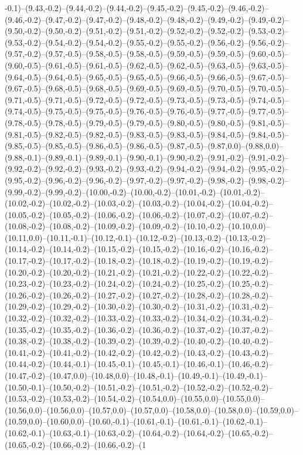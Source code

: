 -0.1)--(9.43,-0.2)--(9.44,-0.2)--(9.44,-0.2)--(9.45,-0.2)--(9.45,-0.2)--(9.46,-0.2)--(9.46,-0.2)--(9.47,-0.2)--(9.47,-0.2)--(9.48,-0.2)--(9.48,-0.2)--(9.49,-0.2)--(9.49,-0.2)--(9.50,-0.2)--(9.50,-0.2)--(9.51,-0.2)--(9.51,-0.2)--(9.52,-0.2)--(9.52,-0.2)--(9.53,-0.2)--(9.53,-0.2)--(9.54,-0.2)--(9.54,-0.2)--(9.55,-0.2)--(9.55,-0.2)--(9.56,-0.2)--(9.56,-0.2)--(9.57,-0.2)--(9.57,-0.5)--(9.58,-0.5)--(9.58,-0.5)--(9.59,-0.5)--(9.59,-0.5)--(9.60,-0.5)--(9.60,-0.5)--(9.61,-0.5)--(9.61,-0.5)--(9.62,-0.5)--(9.62,-0.5)--(9.63,-0.5)--(9.63,-0.5)--(9.64,-0.5)--(9.64,-0.5)--(9.65,-0.5)--(9.65,-0.5)--(9.66,-0.5)--(9.66,-0.5)--(9.67,-0.5)--(9.67,-0.5)--(9.68,-0.5)--(9.68,-0.5)--(9.69,-0.5)--(9.69,-0.5)--(9.70,-0.5)--(9.70,-0.5)--(9.71,-0.5)--(9.71,-0.5)--(9.72,-0.5)--(9.72,-0.5)--(9.73,-0.5)--(9.73,-0.5)--(9.74,-0.5)--(9.74,-0.5)--(9.75,-0.5)--(9.75,-0.5)--(9.76,-0.5)--(9.76,-0.5)--(9.77,-0.5)--(9.77,-0.5)--(9.78,-0.5)--(9.78,-0.5)--(9.79,-0.5)--(9.79,-0.5)--(9.80,-0.5)--(9.80,-0.5)--(9.81,-0.5)--(9.81,-0.5)--(9.82,-0.5)--(9.82,-0.5)--(9.83,-0.5)--(9.83,-0.5)--(9.84,-0.5)--(9.84,-0.5)--(9.85,-0.5)--(9.85,-0.5)--(9.86,-0.5)--(9.86,-0.5)--(9.87,-0.5)--(9.87,0.0)--(9.88,0.0)--(9.88,-0.1)--(9.89,-0.1)--(9.89,-0.1)--(9.90,-0.1)--(9.90,-0.2)--(9.91,-0.2)--(9.91,-0.2)--(9.92,-0.2)--(9.92,-0.2)--(9.93,-0.2)--(9.93,-0.2)--(9.94,-0.2)--(9.94,-0.2)--(9.95,-0.2)--(9.95,-0.2)--(9.96,-0.2)--(9.96,-0.2)--(9.97,-0.2)--(9.97,-0.2)--(9.98,-0.2)--(9.98,-0.2)--(9.99,-0.2)--(9.99,-0.2)--(10.00,-0.2)--(10.00,-0.2)--(10.01,-0.2)--(10.01,-0.2)--(10.02,-0.2)--(10.02,-0.2)--(10.03,-0.2)--(10.03,-0.2)--(10.04,-0.2)--(10.04,-0.2)--(10.05,-0.2)--(10.05,-0.2)--(10.06,-0.2)--(10.06,-0.2)--(10.07,-0.2)--(10.07,-0.2)--(10.08,-0.2)--(10.08,-0.2)--(10.09,-0.2)--(10.09,-0.2)--(10.10,-0.2)--(10.10,0.0)--(10.11,0.0)--(10.11,-0.1)--(10.12,-0.1)--(10.12,-0.2)--(10.13,-0.2)--(10.13,-0.2)--(10.14,-0.2)--(10.14,-0.2)--(10.15,-0.2)--(10.15,-0.2)--(10.16,-0.2)--(10.16,-0.2)--(10.17,-0.2)--(10.17,-0.2)--(10.18,-0.2)--(10.18,-0.2)--(10.19,-0.2)--(10.19,-0.2)--(10.20,-0.2)--(10.20,-0.2)--(10.21,-0.2)--(10.21,-0.2)--(10.22,-0.2)--(10.22,-0.2)--(10.23,-0.2)--(10.23,-0.2)--(10.24,-0.2)--(10.24,-0.2)--(10.25,-0.2)--(10.25,-0.2)--(10.26,-0.2)--(10.26,-0.2)--(10.27,-0.2)--(10.27,-0.2)--(10.28,-0.2)--(10.28,-0.2)--(10.29,-0.2)--(10.29,-0.2)--(10.30,-0.2)--(10.30,-0.2)--(10.31,-0.2)--(10.31,-0.2)--(10.32,-0.2)--(10.32,-0.2)--(10.33,-0.2)--(10.33,-0.2)--(10.34,-0.2)--(10.34,-0.2)--(10.35,-0.2)--(10.35,-0.2)--(10.36,-0.2)--(10.36,-0.2)--(10.37,-0.2)--(10.37,-0.2)--(10.38,-0.2)--(10.38,-0.2)--(10.39,-0.2)--(10.39,-0.2)--(10.40,-0.2)--(10.40,-0.2)--(10.41,-0.2)--(10.41,-0.2)--(10.42,-0.2)--(10.42,-0.2)--(10.43,-0.2)--(10.43,-0.2)--(10.44,-0.2)--(10.44,-0.1)--(10.45,-0.1)--(10.45,-0.1)--(10.46,-0.1)--(10.46,-0.2)--(10.47,-0.2)--(10.47,0.0)--(10.48,0.0)--(10.48,-0.1)--(10.49,-0.1)--(10.49,-0.1)--(10.50,-0.1)--(10.50,-0.2)--(10.51,-0.2)--(10.51,-0.2)--(10.52,-0.2)--(10.52,-0.2)--(10.53,-0.2)--(10.53,-0.2)--(10.54,-0.2)--(10.54,0.0)--(10.55,0.0)--(10.55,0.0)--(10.56,0.0)--(10.56,0.0)--(10.57,0.0)--(10.57,0.0)--(10.58,0.0)--(10.58,0.0)--(10.59,0.0)--(10.59,0.0)--(10.60,0.0)--(10.60,-0.1)--(10.61,-0.1)--(10.61,-0.1)--(10.62,-0.1)--(10.62,-0.1)--(10.63,-0.1)--(10.63,-0.2)--(10.64,-0.2)--(10.64,-0.2)--(10.65,-0.2)--(10.65,-0.2)--(10.66,-0.2)--(10.66,-0.2)--(1